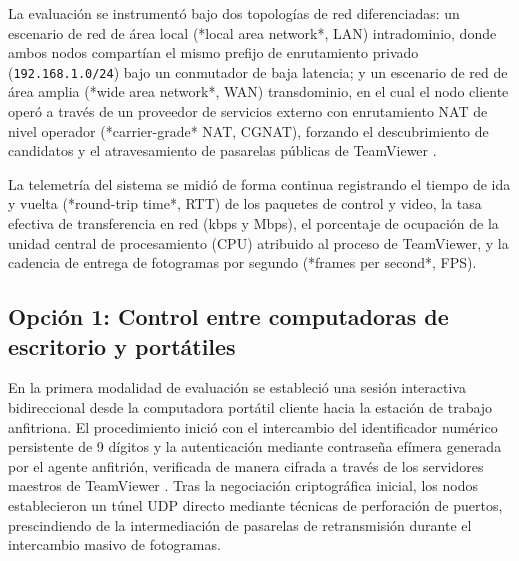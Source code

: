 \documentclass[12pt]{article}
\begin{document}
La evaluación se instrumentó bajo dos topologías de red diferenciadas: un escenario de red de área local (*local area network*, LAN) intradominio, donde ambos nodos compartían el mismo prefijo de enrutamiento privado (\texttt{192.168.1.0/24}) bajo un conmutador de baja latencia; y un escenario de red de área amplia (*wide area network*, WAN) transdominio, en el cual el nodo cliente operó a través de un proveedor de servicios externo con enrutamiento NAT de nivel operador (*carrier-grade* NAT, CGNAT), forzando el descubrimiento de candidatos y el atravesamiento de pasarelas públicas de TeamViewer \parencite{teamviewerSecurityWhitepaper}.

La telemetría del sistema se midió de forma continua registrando el tiempo de ida y vuelta (*round-trip time*, RTT) de los paquetes de control y video, la tasa efectiva de transferencia en red (kbps y Mbps), el porcentaje de ocupación de la unidad central de procesamiento (CPU) atribuido al proceso de TeamViewer, y la cadencia de entrega de fotogramas por segundo (*frames per second*, FPS).

\subsection{Opción 1: Control entre computadoras de escritorio y portátiles}\label{sec:pruebasPcLaptop}

En la primera modalidad de evaluación se estableció una sesión interactiva bidireccional desde la computadora portátil cliente hacia la estación de trabajo anfitriona. El procedimiento inició con el intercambio del identificador numérico persistente de 9 dígitos y la autenticación mediante contraseña efímera generada por el agente anfitrión, verificada de manera cifrada a través de los servidores maestros de TeamViewer \parencite{teamviewerManualRemoteControl}. Tras la negociación criptográfica inicial, los nodos establecieron un túnel UDP directo mediante técnicas de perforación de puertos, prescindiendo de la intermediación de pasarelas de retransmisión durante el intercambio masivo de fotogramas.
\end{document}
